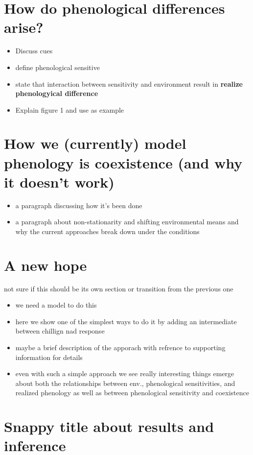 \documentclass{article}[12pt]
\begin{document}
 \section{How do phenological differences arise?}
 \begin{itemize}
 \item Discuss cues
 \item define phenological sensitive
 \item state that interaction between sensitivity and environment result in \textbf{realize phenologyical difference}
 \item Explain figure 1 and use as example
 \end{itemize}

 \section{How we (currently) model phenology is coexistence (and why it doesn't work)}
 \begin{itemize}
 \item a paragraph discussing how it's been done
 \item a paragraph about non-stationarity and shifting environmental means and why the current approaches break down under the conditions
 \end{itemize}

\section{A new hope}
not sure if this should be its own section or transition from the previous one
\begin{itemize}
\item we need a model to do this
\item here we show one of the simplest ways to do it by adding an intermediate between chillign nad response
\item maybe a brief description of the apporach with refrence to supporting information for details
\item even with such a simple approach we see really interesting things emerge about both the relationships between env., phenological sensitivities, and realized phenology as well as between phenological sensitivity and coexistence
\end{itemize}

\section*{Snappy title about results and inference}
\end{document}
